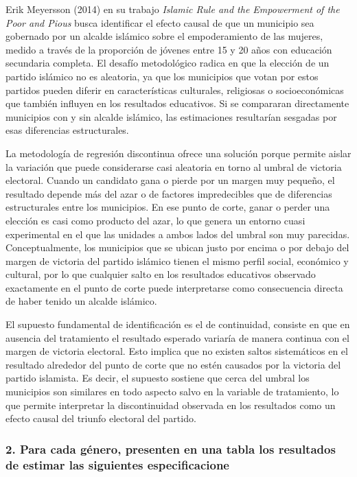 \documentclass[
]{article}
\begin{document}
Erik Meyersson (2014) en su trabajo \emph{Islamic Rule and the
Empowerment of the Poor and Pious} busca identificar el efecto causal de
que un municipio sea gobernado por un alcalde islámico sobre el
empoderamiento de las mujeres, medido a través de la proporción de
jóvenes entre 15 y 20 años con educación secundaria completa. El desafío
metodológico radica en que la elección de un partido islámico no es
aleatoria, ya que los municipios que votan por estos partidos pueden
diferir en características culturales, religiosas o socioeconómicas que
también influyen en los resultados educativos. Si se compararan
directamente municipios con y sin alcalde islámico, las estimaciones
resultarían sesgadas por esas diferencias estructurales.

La metodología de regresión discontinua ofrece una solución porque
permite aislar la variación que puede considerarse casi aleatoria en
torno al umbral de victoria electoral. Cuando un candidato gana o pierde
por un margen muy pequeño, el resultado depende más del azar o de
factores impredecibles que de diferencias estructurales entre los
municipios. En ese punto de corte, ganar o perder una elección es casi
como producto del azar, lo que genera un entorno cuasi experimental en
el que las unidades a ambos lados del umbral son muy parecidas.
Conceptualmente, los municipios que se ubican justo por encima o por
debajo del margen de victoria del partido islámico tienen el mismo
perfil social, económico y cultural, por lo que cualquier salto en los
resultados educativos observado exactamente en el punto de corte puede
interpretarse como consecuencia directa de haber tenido un alcalde
islámico.

El supuesto fundamental de identificación es el de continuidad, consiste
en que en ausencia del tratamiento el resultado esperado variaría de
manera continua con el margen de victoria electoral. Esto implica que no
existen saltos sistemáticos en el resultado alrededor del punto de corte
que no estén causados por la victoria del partido islamista. Es decir,
el supuesto sostiene que cerca del umbral los municipios son similares
en todo aspecto salvo en la variable de tratamiento, lo que permite
interpretar la discontinuidad observada en los resultados como un efecto
causal del triunfo electoral del partido.

\newpage

\subsubsection{2. Para cada género, presenten en una tabla los
resultados de estimar las siguientes
especificacione}\label{para-cada-guxe9nero-presenten-en-una-tabla-los-resultados-de-estimar-las-siguientes-especificacione}
\end{document}
